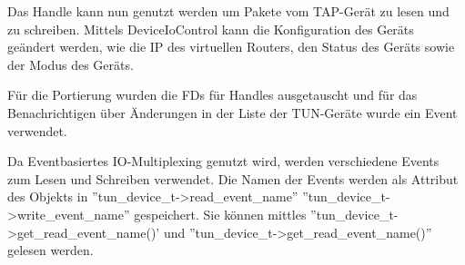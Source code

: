 Das Handle kann nun genutzt werden um Pakete vom TAP-Gerät zu lesen und zu schreiben.
Mittels DeviceIoControl kann die Konfiguration des Geräts geändert werden,
wie die IP des virtuellen Routers, den Status des Geräts sowie der Modus des Geräts.

Für die Portierung wurden die \acp{FD} für Handles ausgetauscht und für das Benachrichtigen
über Änderungen in der Liste der TUN-Geräte wurde ein Event verwendet.

Da Eventbasiertes IO-Multiplexing genutzt wird, werden verschiedene Events zum Lesen
und Schreiben verwendet.
Die Namen der Events werden als Attribut des Objekts in ''tun\_device\_t->read\_event\_name''
''tun\_device\_t->write\_event\_name'' gespeichert. Sie können mittles ''tun\_device\_t->get\_read\_event\_name()'
und ''tun\_device\_t->get\_read\_event\_name()'' gelesen werden.

